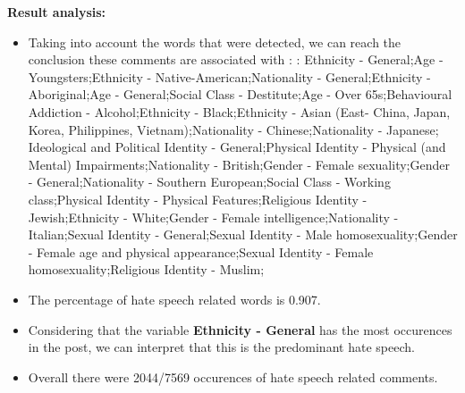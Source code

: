 \documentclass[11pt]{article}
\begin{document}
\textbf{\Large Result analysis:}

\begin{itemize}\item Taking into account the words that were detected, we can reach the conclusion these comments are associated with : : Ethnicity - General;Age - Youngsters;Ethnicity - Native-American;Nationality - General;Ethnicity - Aboriginal;Age - General;Social Class - Destitute;Age - Over 65s;Behavioural Addiction - Alcohol;Ethnicity - Black;Ethnicity - Asian (East- China, Japan, Korea, Philippines, Vietnam);Nationality - Chinese;Nationality - Japanese; Ideological and Political Identity - General;Physical Identity - Physical (and Mental) Impairments;Nationality - British;Gender - Female sexuality;Gender - General;Nationality - Southern European;Social Class - Working class;Physical Identity - Physical Features;Religious Identity - Jewish;Ethnicity - White;Gender - Female intelligence;Nationality - Italian;Sexual Identity - General;Sexual Identity - Male homosexuality;Gender - Female age and physical appearance;Sexual Identity - Female homosexuality;Religious Identity - Muslim;%

\item The percentage of hate speech related words is 0.907.

\item Considering that the variable \textbf{Ethnicity - General} has the most occurences in the post, we can interpret that this is the predominant hate speech.

\item Overall there were 2044/7569 occurences of hate speech related comments.\end{itemize}
\end{document}
